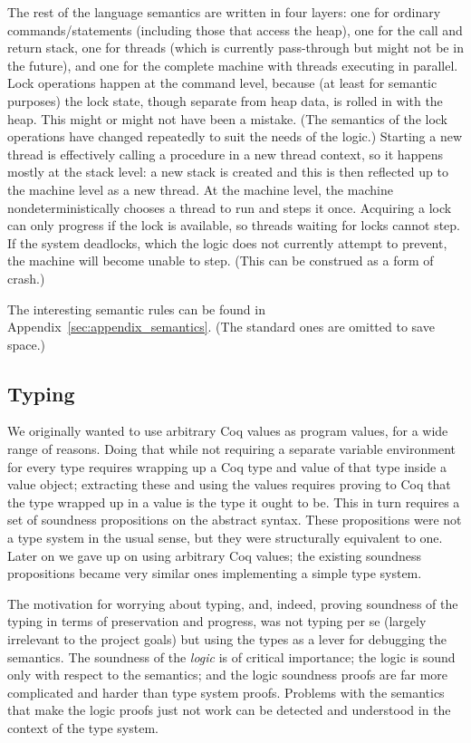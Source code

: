 The rest of the language semantics are written in four layers: one for
ordinary commands/statements (including those that access the heap),
one for the call and return stack, one for threads (which is currently
pass-through but might not be in the future), and one for the complete
machine with threads executing in parallel.
Lock operations happen at the command level, because (at least for
semantic purposes) the lock state, though separate from heap data, is
rolled in with the heap.
This might or might not have been a mistake.
(The semantics of the lock operations have changed repeatedly to suit
the needs of the logic.)
Starting a new thread is effectively calling a procedure in a new
thread context, so it happens mostly at the stack level: a new stack
is created and this is then reflected up to the machine level as a new
thread.
At the machine level, the machine nondeterministically chooses a
thread to run and steps it once.
Acquiring a lock can only progress if the lock is available, so
threads waiting for locks cannot step.
If the system deadlocks, which the logic does not currently attempt to
prevent, the machine will become unable to step.
(This can be construed as a form of crash.)

The interesting semantic rules can be found in Appendix~\ref{sec:appendix_semantics}.
(The standard ones are omitted to save space.)

\subsection{Typing}

We originally wanted to use arbitrary Coq values as program values,
for a wide range of reasons.
Doing that while not requiring a separate variable environment for
every type requires wrapping up a Coq type and value of that type
inside a value object; extracting these and using the values requires
proving to Coq that the type wrapped up in a value is the type it
ought to be.
This in turn requires a set of soundness propositions on the abstract
syntax.
These propositions were not a type system in the usual sense, but they
were structurally equivalent to one.
Later on we gave up on using arbitrary Coq values; the existing
soundness propositions became very similar ones implementing
a simple type system.

The motivation for worrying about typing, and, indeed, proving
soundness of the typing in terms of preservation and progress, was not
typing per se (largely irrelevant to the project goals) but using the
types as a lever for debugging the semantics.
The soundness of the \emph{logic} is of critical importance; the logic
is sound only with respect to the semantics; and the logic soundness
proofs are far more complicated and harder than type system proofs.
Problems with the semantics that make the logic proofs just not work
can be detected and understood in the context of the type system.

